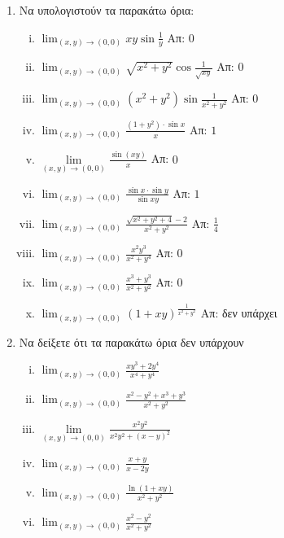 



\everymath{\displaystyle}



\begin{center}
\end{center}


\vspace{\baselineskip}

\begin{enumerate}
  \item Να υπολογιστούν τα παρακάτω όρια:
  \begin{enumerate}[i)]
	  \item $ \lim_{(x,y)\to (0,0)} xy\sin{\frac{ 1 }{ y }} $ \hfill Απ: $ 0 $
  \item $ \lim_{(x,y)\to (0,0)} \sqrt{ x^{2} + y^{2} } \cos{\frac{ 1 }{ \sqrt{ xy } }} $ \hfill Απ: $ 0 $
	  \item $ \lim_{(x,y)\to (0,0)} (x^{2} + y^{2}) \sin{\frac{ 1 }{ x^{2} + y^{2} }} $ \hfill Απ: $ 0 $ 
	  \item $ \lim_{(x,y)\to (0,0)} \frac{ (1+y^{2})\cdot \sin{x} }{ x } $ \hfill Απ: $ 1 $
    \item $\lim\limits_{(x,y)\to (0,0)}\frac{\sin(xy)}{x}$ \hfill Απ: $0$
	\item $ \lim_{(x,y)\to (0,0)} \frac{ \sin{x} \cdot \sin{y} }{ \sin{xy} } $ \hfill Απ: $ 1 $
	\item $ \lim_{(x,y)\to (0,0)} \frac{ \sqrt{ x^{2}+y^{2}+4 } - 2 }{ x^{2}+y^{2} } $ \hfill Απ: $
		\frac{ 1 }{ 4 } $
\item $ \lim_{(x,y)\to (0,0)} \frac{ x^{2}y^{3} }{x^{2}+y^{4}}    $ \hfill Απ: $0 $ 
\item $ \lim_{(x,y)\to (0,0)} \frac{ x^{3}+y^{3} }{ x^{2}+y^{2} } $ \hfill Απ: $ 0 $
\item $ \lim_{(x,y)\to (0,0)} (1+xy)^{\frac{ 1 }{ x^{2}+y^{2} }} $ \hfill Απ: δεν υπάρχει
		  \end{enumerate}
  
  \item Να δείξετε ότι τα παρακάτω όρια δεν υπάρχουν

	  \begin{enumerate}[i)]
		  \item $ \lim_{(x,y)\to (0,0)} \frac{ xy^{3} + 2y^{4} }{ x^{4}+y^{4}}  $
		  \item $ \lim_{(x,y)\to (0,0)} \frac{ x^{2}-y^{2}+x^{3}+y^{3} }{ x^{2}+y^{2} } $ 
		  \item $\lim\limits_{(x,y)\to (0,0)}\frac{x^{2}y^{2}}{x^{2}y^{2}+(x-y)^{2}}$ 
		  \item $ \lim_{(x,y)\to (0,0)} \frac{ x + y }{ x - 2y } $ 
		  \item $ \lim_{(x,y)\to (0,0)} \frac{ \ln{( 1+xy )} }{ x^{2}+y^{2} }  $
		  \item $ \lim_{(x,y)\to (0,0)} \frac{ x^{2}-y^{2} }{ x^{2}+y^{2} } $ 
	  \end{enumerate}


\end{enumerate}
